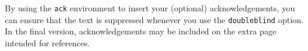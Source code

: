 \documentclass[doubleblind]{ecai}
\begin{document}
	

	
	
	\begin{ack}
		By using the \texttt{ack} environment to insert your (optional) 
		acknowledgements, you can ensure that the text is suppressed whenever 
		you use the \texttt{doubleblind} option. In the final version, 
		acknowledgements may be included on the extra page intended for references.
	\end{ack}
	
	
	
	
	
\end{document}

